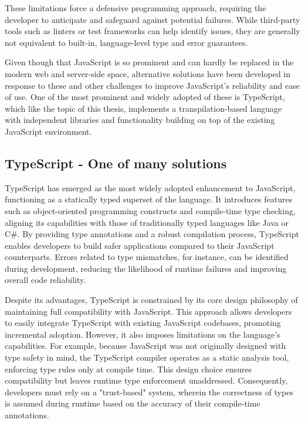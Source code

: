 These limitations force a defensive programming approach, requiring the developer to anticipate and safeguard against potential failures. While third-party tools such as linters or test frameworks can help identify issues, they are generally not equivalent to built-in, language-level type and error guarantees.

Given though that JavaScript is so prominent and can hardly be replaced in the modern web and server-side space, alternative solutions have been developed in response to these and other challenges to improve JavaScript's reliability and ease of use. One of the most prominent and widely adopted of these is TypeScript, which like the topic of this thesis, implements a \gls{transpilation}-based language with independent libraries and functionality building on top of the existing JavaScript environment.

\subsection{TypeScript - One of many solutions}

TypeScript has emerged as the most widely adopted enhancement to JavaScript, functioning as a statically typed superset of the language. It introduces features such as object-oriented programming constructs and compile-time type checking, aligning its capabilities with those of traditionally typed languages like Java or C\#. By providing type annotations and a robust compilation process, TypeScript enables developers to build safer applications compared to their JavaScript counterparts. Errors related to type mismatches, for instance, can be identified during development, reducing the likelihood of runtime failures and improving overall code reliability.

Despite its advantages, TypeScript is constrained by its core design philosophy of maintaining full compatibility with JavaScript. This approach allows developers to easily integrate TypeScript with existing JavaScript codebases, promoting incremental adoption. However, it also imposes limitations on the language’s capabilities. For example, because JavaScript was not originally designed with type safety in mind, the TypeScript compiler operates as a static analysis tool, enforcing type rules only at compile time. This design choice ensures compatibility but leaves runtime type enforcement unaddressed. Consequently, developers must rely on a "trust-based" system, wherein the correctness of types is assumed during runtime based on the accuracy of their compile-time annotations.

